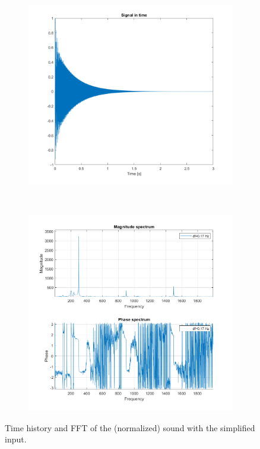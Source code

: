 \documentclass[a4paper]{article}
\begin{document}
\begin{figure}[h]
	\centering
	\begin{subfigure}{0.4\linewidth}
		\centering
		\includegraphics[width=0.9\linewidth]{simpOut.png}
	\end{subfigure}
~
	\begin{subfigure}{0.4\linewidth}
		\centering
		\includegraphics[width=0.9\linewidth]{simpSpect.png}
	\end{subfigure}
	\caption{Time history and FFT of the (normalized) sound with the simplified input.}
	\label{fig:nostring}
\end{figure}
\end{document}

